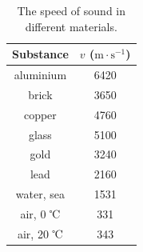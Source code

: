 \begin{table}[H]
 \begin{tabular}{|c|c|}\hline
Substance	& $v$ ($\text{m}\cdot \text{s}^{-1}$)\\ \hline \hline
aluminium	&6420 \\ \hline
brick	&3650 \\ \hline
copper	&4760	 	 \\ \hline
glass &5100	 \\ \hline 	 	 
gold	&3240	 \\ \hline 	
lead	&2160	 \\ \hline 
water, sea	&1531 \\ \hline
air, 0 ℃	&331 \\ \hline
air, 20 ℃	&343 \\ \hline
\end{tabular}
\caption{The speed of sound in different materials.}
\end{table}

